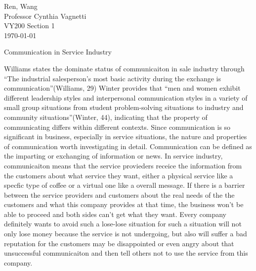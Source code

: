 \documentclass[12pt]{article}
\begin{document}
\begin{flushleft}

Ren, Wang\\
Professor Cynthia Vagnetti \\
VY200 Section 1\\
\today\\


\begin{center}
  Communication in Service Industry
\end{center}


\setlength{\parindent}{0.5in}
Williams states the dominate status of communicaiton in sale industry through
``The industrial salesperson's most basic activity during the exchange is
communication''(Williams, 29) Winter provides that ``men and women exhibit
different leadership styles and interpersonal communication styles in a variety
of small group situations from student problem-solving situations to industry
and community situations''(Winter, 44), indicating that the property of communicating
differs within different contexts.
Since communication is so significant in business, especially in service
situations, the nature and  properties of communication worth investigating in detail.
Communication can be defined as the imparting or exchanging of information or news.
In service industry, communicaiton means that the service provieders receice the
information from the customers about what service they want, either a physical
service like a specfic type of coffee or a virtual one like a overall message.
If there is a barrier between the service providers and customers about the real
needs of the the customers and what this company provides at that time, the
business won't be able to proceed and both sides can't get what they want. Every
company definitely wants to avoid such a lose-lose situation for such a
situation will not only lose money because the service is not undergoing, but
also will suffer a bad reputation for the customers may be disappointed or even
angry about that unsuccessful communicaiton and then tell others not to use the
service from this company.




\end{flushleft}
\end{document}
